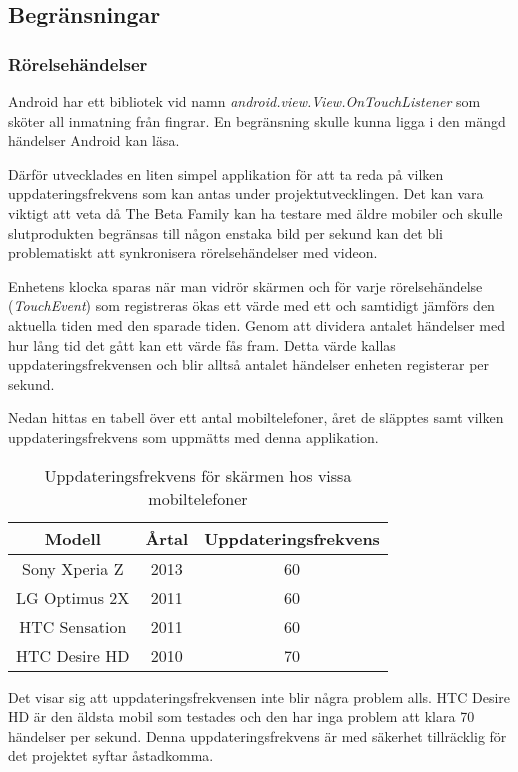 \subsection{Begränsningar}

\subsubsection{Rörelsehändelser}
\label{touchevents}
Android har ett bibliotek vid namn \emph{android.view.View.OnTouchListener}\parencite{touchlistener} som sköter all inmatning från fingrar. En begränsning skulle kunna ligga i den mängd händelser Android kan läsa. 

Därför utvecklades en liten simpel applikation för att ta reda på vilken uppdateringsfrekvens som kan antas under projektutvecklingen. Det kan vara viktigt att veta då The Beta Family kan ha testare med äldre mobiler och skulle slutprodukten begränsas till någon enstaka bild per sekund kan det bli problematiskt att synkronisera rörelsehändelser med videon.

Enhetens klocka sparas när man vidrör skärmen och för varje rörelsehändelse (\emph{TouchEvent}) som registreras ökas ett värde med ett och samtidigt jämförs den aktuella tiden med den sparade tiden. Genom att dividera antalet händelser med hur lång tid det gått kan ett värde fås fram. Detta värde kallas uppdateringsfrekvensen och blir alltså antalet händelser enheten registerar per sekund.

Nedan hittas en tabell över ett antal mobiltelefoner, året de släpptes samt vilken uppdateringsfrekvens som uppmätts med denna applikation.
\begin{table}[h!]
	\begin{center}
	\begin{tabular}{| c | c | c |}
		\hline
		Modell & Årtal & Uppdateringsfrekvens \\
		\hline
		Sony Xperia Z & 2013 & 60 \\
		LG Optimus 2X & 2011 & 60 \\
		HTC Sensation & 2011 & 60 \\
		HTC Desire HD & 2010 & 70 \\
		\hline
	\end{tabular}
	\end{center}
	\label{tab:uppdateringsfrekvens}
	\caption{Uppdateringsfrekvens för skärmen hos vissa mobiltelefoner}
\end{table}

Det visar sig att uppdateringsfrekvensen inte blir några problem alls. HTC Desire HD är den äldsta mobil som testades och den har inga problem att klara 70 händelser per sekund. Denna uppdateringsfrekvens är med säkerhet tillräcklig för det projektet syftar åstadkomma.
